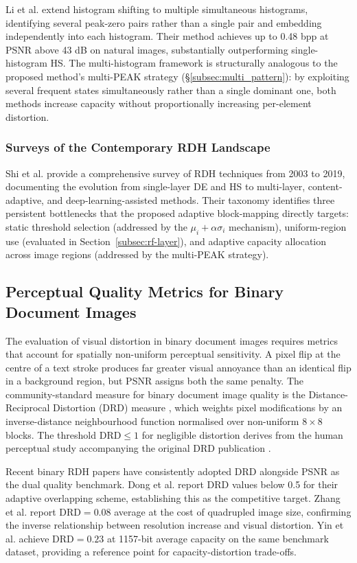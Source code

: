 \documentclass[a4paper,fleqn]{cas-dc}
\begin{document}
Li et al. \cite{Li2019MultiHist} extend histogram shifting to multiple simultaneous histograms, identifying several peak-zero pairs rather than a single pair and embedding independently into each histogram. Their method achieves up to 0.48 bpp at PSNR above 43 dB on natural images, substantially outperforming single-histogram HS. The multi-histogram framework is structurally analogous to the proposed method's multi-PEAK strategy (\S\ref{subsec:multi_pattern}): by exploiting several frequent states simultaneously rather than a single dominant one, both methods increase capacity without proportionally increasing per-element distortion.

\subsubsection{Surveys of the Contemporary RDH Landscape}

Shi et al. \cite{Shi2019Survey} provide a comprehensive survey of RDH techniques from 2003 to 2019, documenting the evolution from single-layer DE and HS to multi-layer, content-adaptive, and deep-learning-assisted methods. Their taxonomy identifies three persistent bottlenecks that the proposed adaptive block-mapping directly targets: static threshold selection (addressed by the $\mu_i + \alpha\sigma_i$ mechanism), uniform-region use (evaluated in Section~\ref{subsec:rf-layer}), and adaptive capacity allocation across image regions (addressed by the multi-PEAK strategy).

\subsection{Perceptual Quality Metrics for Binary Document Images}

The evaluation of visual distortion in binary document images requires metrics that account for spatially non-uniform perceptual sensitivity. A pixel flip at the centre of a text stroke produces far greater visual annoyance than an identical flip in a background region, but PSNR assigns both the same penalty. The community-standard measure for binary document image quality is the Distance-Reciprocal Distortion (DRD) measure \cite{3535}, which weights pixel modifications by an inverse-distance neighbourhood function normalised over non-uniform $8\times8$ blocks. The threshold $\text{DRD} \leq 1$ for negligible distortion derives from the human perceptual study accompanying the original DRD publication \cite{3535}.

Recent binary RDH papers have consistently adopted DRD alongside PSNR as the dual quality benchmark. Dong et al. \cite{Dong2020Adaptive} report DRD values below 0.5 for their adaptive overlapping scheme, establishing this as the competitive target. Zhang et al. \cite{Zhang2022Magnification} report $\text{DRD} = 0.08$ average at the cost of quadrupled image size, confirming the inverse relationship between resolution increase and visual distortion. Yin et al. \cite{Yin2020PPOCP} achieve $\text{DRD} = 0.23$ at 1157-bit average capacity on the same benchmark dataset, providing a reference point for capacity-distortion trade-offs.
\end{document}
